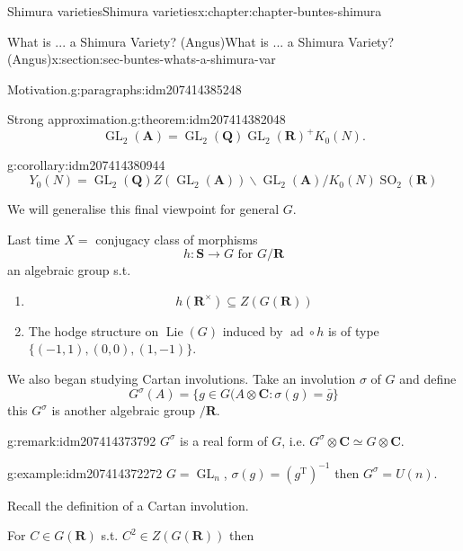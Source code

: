 \documentclass[oneside,10pt,]{book}
\numberwithin{equation}{section}
\DeclareMathOperator{\Lie}{Lie}
\newcommand{\inv}{^{-1}}
\newcommand{\QQ}{\mathbf{Q}}
\newcommand{\RR}{\mathbf{R}}
\newcommand{\CC}{\mathbf{C}}
\newcommand{\adeles}{\mathbf{A}}
\newcommand{\transpose}{\mathrm{T}}
\DeclareMathOperator{\ad}{ad}
\DeclareMathOperator{\GL}{GL}
\DeclareMathOperator{\specialorthogonal}{SO}
\begin{document}
\begin{chapterptx}{Shimura varieties}{}{Shimura varieties}{}{}{x:chapter:chapter-buntes-shimura}
\begin{sectionptx}{What is ... a Shimura Variety? (Angus)}{}{What is ... a Shimura Variety? (Angus)}{}{}{x:section:sec-buntes-whats-a-shimura-var}
\begin{paragraphs}{Motivation.}{g:paragraphs:idm207414385248}
\begin{equation*}
\end{equation*}
%
\begin{theorem}{Strong approximation.}{}{g:theorem:idm207414382048}%
%
\begin{equation*}
\GL_2(\adeles) = \GL_2(\QQ) \GL_2(\RR)^+ K_0(N)\text{.}
\end{equation*}
%
\end{theorem}
\begin{corollary}{}{}{g:corollary:idm207414380944}%
%
\begin{equation*}
Y_0(N) = \GL_2(\QQ)Z(\GL_2(\adeles)) \backslash \GL_2(\adeles) / K_0(N) \specialorthogonal_2(\RR)
\end{equation*}
%
\end{corollary}
We will generalise this final viewpoint for general \(G\).%
\end{paragraphs}%
\par
Last time \(X = \) conjugacy class of morphisms%
\begin{equation*}
h \colon \mathbf S \to G\text{ for } G/\RR
\end{equation*}
an algebraic group s.t.%
\begin{enumerate}
\item{}%
\begin{equation*}
h(\RR^\times)  \subseteq Z(G(\RR))
\end{equation*}
%
\item{}The hodge structure on \(\Lie(G)\) induced by \(\ad \circ h\) is of type \(\{(-1,1), (0,0), (1,-1)\}\).%
\end{enumerate}
%
\par
We also began studying Cartan involutions. Take an involution \(\sigma\) of \(G\) and define%
\begin{equation*}
G^\sigma(A) = \{ g\in G(A \otimes \CC : \sigma(g) = \bar g\}
\end{equation*}
this \(G^\sigma\) is another algebraic group \(/\RR\).%
\begin{remark}{}{g:remark:idm207414373792}%
\(G^\sigma\) is a real form of \(G\), i.e. \(G^\sigma \otimes \CC \simeq G \otimes \CC\).%
\end{remark}
\begin{example}{}{g:example:idm207414372272}%
\(G  =\GL_n\), \(\sigma(g) = (g^\transpose)\inv\) then \(G^\sigma =  U(n)\).%
\end{example}
Recall the definition of a Cartan involution.%
\par
For \(C \in G(\RR)\) s.t. \(C^2 \in Z(G(\RR))\) then%
\begin{equation*}

\end{equation*}
\end{sectionptx}
\end{chapterptx}
\end{document}
